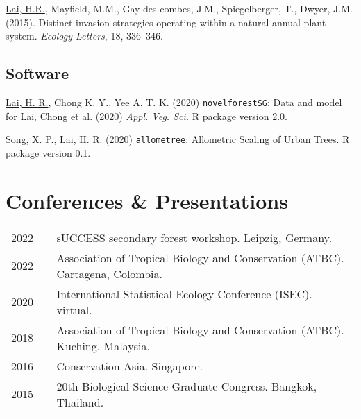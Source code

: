 \documentclass[a4paper]{article}
\begin{document}
\hangindent=1cm \underline{Lai, H.R.}, Mayfield, M.M., Gay-des-combes, J.M., Spiegelberger, T., Dwyer, J.M. (2015). Distinct invasion strategies operating within a natural annual plant system. \textit{Ecology Letters}, 18, 336--346.

\subsection*{Software}
\hangindent=1cm \underline{Lai, H. R.}, Chong K. Y., Yee A. T. K. (2020) \texttt{novelforestSG}: Data and model for Lai, Chong et al. (2020) \textit{Appl. Veg. Sci.} R package version 2.0.

\hangindent=1cm Song, X. P., \underline{Lai, H. R.} (2020) \texttt{allometree}: Allometric Scaling of Urban Trees. R package version 0.1.

\section*{Conferences \& Presentations}
\begin{tabular}{p{0.13\linewidth} p{0.87\linewidth}}
2022 & sUCCESS secondary forest workshop. Leipzig, Germany. \\
2022 & Association of Tropical Biology and Conservation (ATBC). Cartagena, Colombia. \\
2020 & International Statistical Ecology Conference (ISEC). virtual. \\
2018 & Association of Tropical Biology and Conservation (ATBC). Kuching, Malaysia. \\
2016 & Conservation Asia. Singapore. \\
2015 & 20th Biological Science Graduate Congress. Bangkok, Thailand. \\
\end{tabular}
\end{document}
